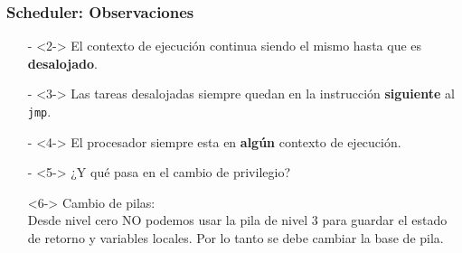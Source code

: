 \documentclass[aspectratio=169]{beamer}
\begin{document}
\begin{frame}
    \frametitle{Scheduler: Observaciones}
    \begin{itemize}
    \large 
    \setlength\itemsep{0.5cm}
    \item[-]<2-> El contexto de ejecución continua siendo el mismo hasta que es \textbf{desalojado}. 
    \item[-]<3-> Las tareas desalojadas siempre quedan en la instrucción \textbf{siguiente} al \texttt{jmp}.
    \item[-]<4-> El procesador siempre esta en \textbf{algún} contexto de ejecución.
    \item[-]<5-> ¿Y qué pasa en el cambio de privilegio?
    \item[]<6-> \small
    \hspace{1cm}\textcolor{verdeuca}{Cambio de pilas:}\\
    \hspace{2cm} Desde nivel cero NO podemos usar la pila de nivel 3 para guardar el estado\\
    \hspace{2cm} de retorno y variables locales. Por lo tanto se debe cambiar la base de pila.\\
    \\
    \end{itemize}
\end{frame}
\end{document}
